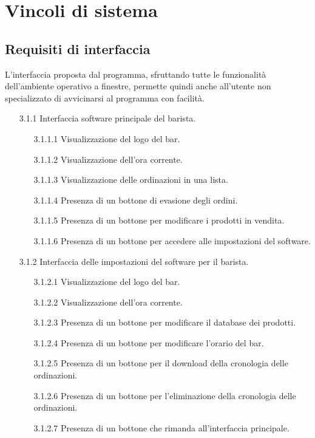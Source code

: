 \documentclass[a4paper,11pt]{article}       %
\begin{document}
\section{Vincoli di sistema}

    \subsection{Requisiti di interfaccia}
    L'interfaccia proposta dal programma, sfruttando tutte le funzionalità dell'ambiente operativo 
    a finestre, permette quindi anche all'utente non specializzato di avvicinarsi al programma con facilità.
        \begin{itemize}
            \item[3.1.1] Interfaccia software principale del barista.
                \begin{itemize}
                    \item[3.1.1.1] Visualizzazione del logo del bar.
                    \item[3.1.1.2] Visualizzazione dell'ora corrente.
                    \item[3.1.1.3] Visualizzazione delle ordinazioni in una lista.
                    \item[3.1.1.4] Presenza di un bottone di evasione degli ordini.
                    \item[3.1.1.5] Presenza di un bottone per modificare i prodotti in vendita.
                    \item[3.1.1.6] Presenza di un bottone per accedere alle impostazioni del software.
                \end{itemize}
                
            \item[3.1.2] Interfaccia delle impostazioni del software per il barista.
                \begin{itemize}
                    \item[3.1.2.1] Visualizzazione del logo del bar.
                    \item[3.1.2.2] Visualizzazione dell'ora corrente.
                    \item[3.1.2.3] Presenza di un bottone per modificare il \gls{database} dei prodotti.
                    \item[3.1.2.4] Presenza di un bottone per modificare l'orario del bar.
                    \item[3.1.2.5] Presenza di un bottone per il download della cronologia delle ordinazioni.
                    \item[3.1.2.6] Presenza di un bottone per l'eliminazione della cronologia delle ordinazioni.
                    \item[3.1.2.7] Presenza di un bottone che rimanda all'interfaccia principale.
                \end{itemize}
            

\end{itemize}
\end{document}
